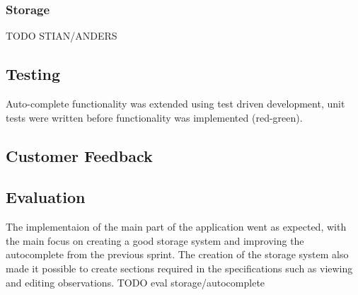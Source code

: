 	\subsubsection{Storage}
	TODO STIAN/ANDERS
	
\subsection{Testing}

Auto-complete functionality was extended using test driven development, unit
tests were written before functionality was implemented (red-green).

\subsection{Customer Feedback}

\subsection{Evaluation}
The implementaion of the main part of the application went as expected, with the main focus on creating a good storage system and improving the autocomplete from the previous sprint. The creation of the storage system also made it possible to create sections required in the specifications such as viewing and editing observations.
TODO eval storage/autocomplete
